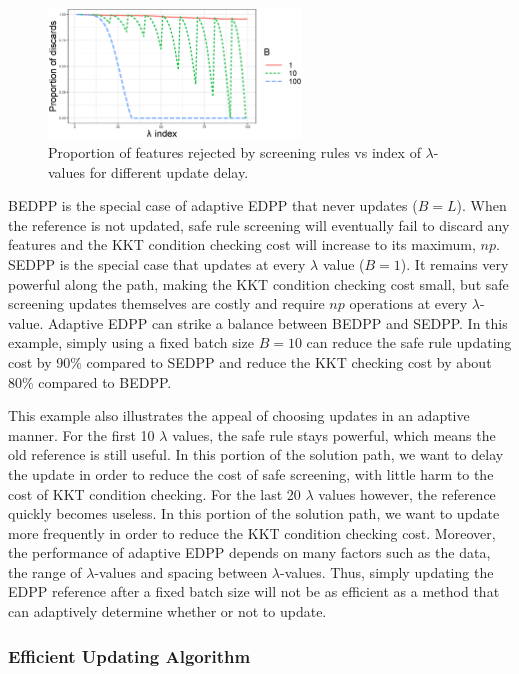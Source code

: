 \documentclass[]{interact}
\theoremstyle{plain}%
\theoremstyle{definition}
\theoremstyle{remark}
\begin{document}
\begin{figure}[ht]
    \centering
    \includegraphics[width=0.6\textwidth]{batchsizes.eps}    \caption{Proportion of features rejected by screening rules vs index of $\lambda$-values for different update delay.}
    \label{fig:batchsizes}
\end{figure}

BEDPP is the special case of adaptive EDPP that never updates ($B=L$). When the reference is not updated, safe rule screening will eventually fail to discard any features and the KKT condition checking cost will increase to its maximum, $np$. SEDPP is the special case that updates at every $\lambda$ value ($B=1$). It remains very powerful along the path, making the KKT condition checking cost small, but safe screening updates themselves are costly and require $np$ operations at every $\lambda$-value. Adaptive EDPP can strike a balance between BEDPP and SEDPP. In this example, simply using a fixed batch size $B=10$ can reduce the safe rule updating cost by 90\% compared to SEDPP and reduce the KKT checking cost by about 80\% compared to BEDPP.

This example also illustrates the appeal of choosing updates in an adaptive manner. For the first 10 $\lambda$ values, the safe rule stays powerful, which means the old reference is still useful. In this portion of the solution path, we want to delay the update in order to reduce the cost of safe screening, with little harm to the cost of KKT condition checking. For the last 20 $\lambda$ values however, the reference quickly becomes useless. In this portion of the solution path, we want to update more frequently in order to reduce the KKT condition checking cost. Moreover, the performance of adaptive EDPP depends on many factors such as the data, the range of $\lambda$-values and spacing between $\lambda$-values. Thus, simply updating the EDPP reference after a fixed batch size will not be as efficient as a method that can adaptively determine whether or not to update.

\subsubsection{Efficient Updating Algorithm}
\end{document}
